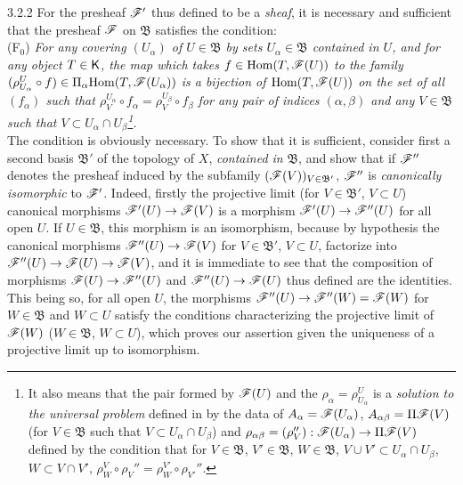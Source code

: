 \begin{env}{3.2.2}
\label{env-0.3.2.2}
For the presheaf $\mathscr{F}'$ thus defined to be a \emph{sheaf}, it is necessary and sufficient
that the presheaf $\mathscr{F}$ on $\mathfrak{B}$ satisfies the condition:\\

(F$_0$) \emph{For any covering $(U_\alpha)$ of $U\in\mathfrak{B}$ by sets
        $U_\alpha\in\mathfrak{B}$ contained in $U$, and for any object $T\in\mathsf{K}$, the map
        which takes $f\in{\mathop{\mathrm{Hom}}\nolimits}(T,\mathscr{F}(U))$ to the family
        $(\rho_{U_\alpha}^U\circ f)\in\Pi_\alpha{\mathop{\mathrm{Hom}}\nolimits}(T,\mathscr{F}(U_\alpha))$ is a bijection of
        ${\mathop{\mathrm{Hom}}\nolimits}(T,\mathscr{F}(U))$ on the set of all $(f_\alpha)$ such that
        $\rho_V^{U_\alpha}\circ f_\alpha=\rho_V^{U_\beta}\circ f_\beta$ for any pair of
        indices $(\alpha,\beta)$ and any $V\in\mathfrak{B}$ such that
        $V\subset U_\alpha\cap U_\beta$\footnote{It also means that the pair formed by
        $\mathscr{F}(U)$ and the $\rho_\alpha=\rho_{U_\alpha}^U$ is a \emph{solution to the
        universal problem} defined in  by the data of
        $A_\alpha=\mathscr{F}(U_\alpha)$, $A_{\alpha\beta}=\Pi\mathscr{F}(V)$ (for $V\in\mathfrak{B}$
        such that $V\subset U_\alpha\cap U_\beta$) and
        $\rho_{\alpha\beta}=(\rho_V''):\mathscr{F}(U_\alpha)\to\Pi\mathscr{F}(V)$ defined by the
        condition that for $V\in\mathfrak{B}$, $V'\in\mathfrak{B}$, $W\in\mathfrak{B}$,
        $V\cup V'\subset U_\alpha\cap U_\beta$, $W\subset V\cap V'$,
        $\rho_W^V\circ\rho_V''=\rho_W^{V'}\circ\rho_{V'}''$.}.}\\

The condition is obviously necessary. To show that it is sufficient, consider first a second
basis $\mathfrak{B}'$ of the topology of $X$, \emph{contained in} $\mathfrak{B}$, and show
that if $\mathscr{F}''$ denotes the presheaf induced by the subfamily
$(\mathscr{F}(V))_{V\in\mathfrak{B}'}$, $\mathscr{F}''$ is \emph{canonically isomorphic} to $\mathscr{F}'$.
Indeed, firstly the projective limit (for $V\in\mathfrak{B}'$, $V\subset U$) canonical
morphisms ${\mathscr{F}'(U)\to\mathscr{F}(V)}$ is a morphism $\mathscr{F}'(U)\to\mathscr{F}''(U)$ for all open
$U$. If $U\in\mathfrak{B}$, this morphism is an isomorphism, because by hypothesis the
canonical morphisms $\mathscr{F}''(U)\to\mathscr{F}(V)$ for $V\in\mathfrak{B}'$, $V\subset U$,
factorize into $\mathscr{F}''(U)\to\mathscr{F}(U)\to\mathscr{F}(V)$, and it is immediate to see that the
composition of morphisms $\mathscr{F}(U)\to\mathscr{F}''(U)$ and $\mathscr{F}''(U)\to\mathscr{F}(U)$ thus defined
are the identities. This being so, for all open $U$, the morphisms
$\mathscr{F}''(U)\to\mathscr{F}''(W)=\mathscr{F}(W)$ for $W\in\mathfrak{B}$ and $W\subset U$ satisfy the
conditions characterizing the projective limit of $\mathscr{F}(W)$ ($W\in\mathfrak{B}$,
$W\subset U$), which proves our assertion given the uniqueness of a projective limit up
to isomorphism.


\end{env}
